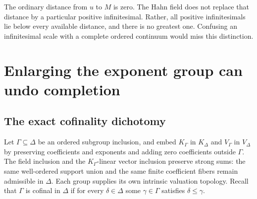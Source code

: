 \documentclass[11pt,letterpaper]{article}
\numberwithin{equation}{section}
\theoremstyle{definition}
\theoremstyle{remark}
\begin{document}
The ordinary distance from $u$ to $M$ is zero. The Hahn field does not
replace that distance by a particular positive infinitesimal. Rather,
all positive infinitesimals lie below every available distance, and
there is no greatest one. Confusing an infinitesimal scale with a
complete ordered continuum would miss this distinction.

\section{Enlarging the exponent group can undo completion}
\label{duals:sec:enlargement}

\subsection{The exact cofinality dichotomy}
Let $\Gamma\subseteq\Delta$ be an ordered subgroup inclusion, and
embed $K_\Gamma$ in $K_\Delta$ and $V_\Gamma$ in $V_\Delta$ by
preserving coefficients and exponents and adding zero coefficients
outside $\Gamma$. The field inclusion and the $K_\Gamma$-linear vector
inclusion preserve strong sums: the same well-ordered support union
and the same finite coefficient fibers remain admissible in $\Delta$. Each group supplies its own intrinsic valuation topology.
Recall that $\Gamma$ is cofinal in $\Delta$ if for every
$\delta\in\Delta$ some $\gamma\in\Gamma$ satisfies
$\delta\le\gamma$.
\end{document}
